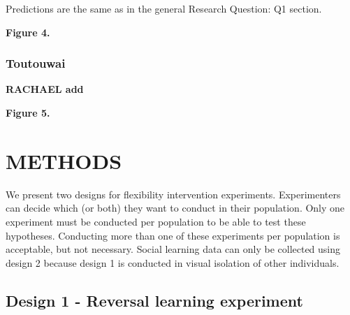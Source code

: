 \documentclass[
]{article}
\begin{document}
Predictions are the same as in the general Research Question: Q1
section.

\textbf{Figure 4.}

\hypertarget{toutouwai}{%
\subsubsection{Toutouwai}\label{toutouwai}}

\textbf{RACHAEL add}

\textbf{Figure 5.}

\hypertarget{methods}{%
\section{METHODS}\label{methods}}

We present two designs for flexibility intervention experiments.
Experimenters can decide which (or both) they want to conduct in their
population. Only one experiment must be conducted per population to be
able to test these hypotheses. Conducting more than one of these
experiments per population is acceptable, but not necessary. Social
learning data can only be collected using design 2 because design 1 is
conducted in visual isolation of other individuals.

\hypertarget{design-1---reversal-learning-experiment}{%
\subsection{\texorpdfstring{\textbf{Design 1 - Reversal learning
experiment}}{Design 1 - Reversal learning experiment}}\label{design-1---reversal-learning-experiment}}
\end{document}
